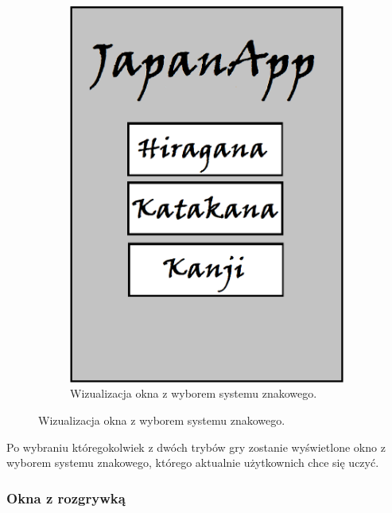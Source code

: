 \documentclass[15pt]{article}
\begin{document}
\begin{figure}[h!]
\begin{subfigure}[b]{0.35\linewidth}
    \includegraphics[width=\linewidth]{chose.png}
    \caption{Wizualizacja okna z wyborem systemu znakowego.}
  \end{subfigure}
  \label{fig:coffee}
\end{figure}

Po wybraniu któregokolwiek z dwóch trybów gry zostanie wyświetlone okno z wyborem systemu znakowego, którego aktualnie użytkownich chce się uczyć.
\subsubsection{Okna z rozgrywką}
\end{document}

